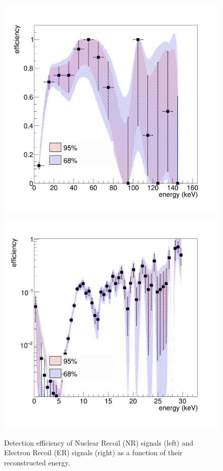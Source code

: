 \documentclass[12pt]{iopart}
\begin{document}
\begin{figure}[ht]
	\centering
	\includegraphics[width=0.45\linewidth]{effS.png}	\includegraphics[width=0.45\linewidth]{effB.png}
  	\caption{Detection efficiency of Nuclear Recoil (NR) signals (left) and Electron Recoil (ER) signals (right) as a function of their reconstructed energy.}
  	\label{fig:effB}
\end{figure}
\end{document}
